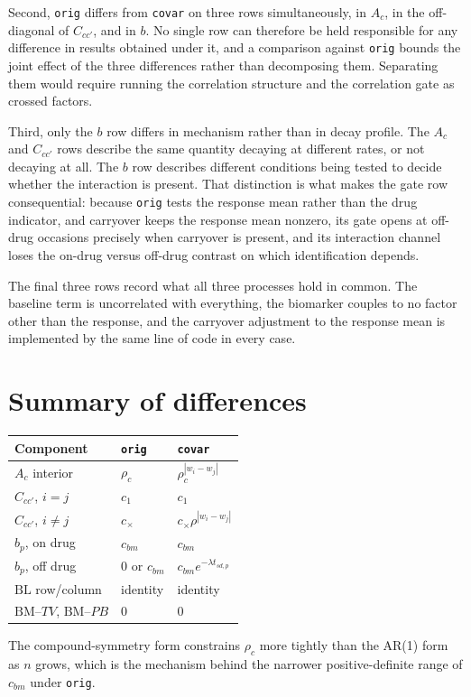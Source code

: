 \documentclass[11pt]{article}
\newcommand{\bm}{\mathrm{BM}}
\newcommand{\bl}{\mathrm{BL}}
\begin{document}
Second, \texttt{orig} differs from \texttt{covar} on three rows
simultaneously, in $A_c$, in the off-diagonal of $C_{cc'}$, and in
$b$. No single row can therefore be held responsible for any
difference in results obtained under it, and a comparison against
\texttt{orig} bounds the joint effect of the three differences rather
than decomposing them. Separating them would require running the
correlation structure and the correlation gate as crossed factors.

Third, only the $b$ row differs in mechanism rather than in decay
profile. The $A_c$ and $C_{cc'}$ rows describe the same quantity
decaying at different rates, or not decaying at all. The $b$ row
describes different conditions being tested to decide whether the
interaction is present. That distinction is what makes the gate row
consequential: because \texttt{orig} tests the response mean rather
than the drug indicator, and carryover keeps the response mean
nonzero, its gate opens at off-drug occasions precisely when carryover
is present, and its interaction channel loses the on-drug versus
off-drug contrast on which identification depends.

The final three rows record what all three processes hold in common.
The baseline term is uncorrelated with everything, the biomarker
couples to no factor other than the response, and the carryover
adjustment to the response mean is implemented by the same line of
code in every case.

\section{Summary of differences}

\begin{center}
\begin{tabular}{lll}
\toprule
Component & \texttt{orig} & \texttt{covar}\\
\midrule
$A_c$ interior & $\rho_c$ & $\rho_c^{|w_i - w_j|}$\\
$C_{cc'}$, $i = j$ & $c_1$ & $c_1$\\
$C_{cc'}$, $i \neq j$ & $c_{\times}$ & $c_{\times}\rho^{|w_i-w_j|}$\\
$b_p$, on drug & $c_{bm}$ & $c_{bm}$\\
$b_p$, off drug & $0$ or $c_{bm}$ & $c_{bm}e^{-\lambda t_{sd,p}}$\\
$\bl$ row/column & identity & identity\\
$\bm$--$TV$, $\bm$--$PB$ & $0$ & $0$\\
\bottomrule
\end{tabular}
\end{center}

The compound-symmetry form constrains $\rho_c$ more tightly than the
AR(1) form as $n$ grows, which is the mechanism behind the narrower
positive-definite range of $c_{bm}$ under \texttt{orig}.
\end{document}
